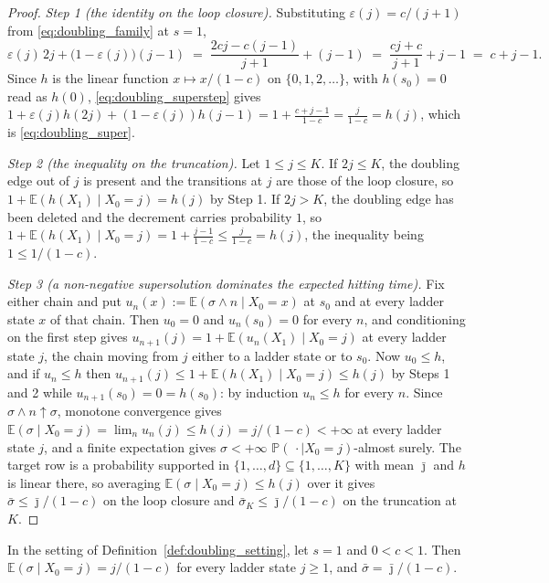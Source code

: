 \begin{proof}
\emph{Step 1 (the identity on the loop closure).} Substituting $\varepsilon(j)=c/(j+1)$ from
\eqref{eq:doubling_family} at $s=1$,
\begin{equation}\label{eq:doubling_superstep}
    \varepsilon(j)\,2j+\bigl(1-\varepsilon(j)\bigr)(j-1)
    \;=\;\frac{2cj-c(j-1)}{j+1}+(j-1)\;=\;\frac{cj+c}{j+1}+j-1\;=\;c+j-1 .
\end{equation}
Since $h$ is the linear function $x\mapsto x/(1-c)$ on $\{0,1,2,\dots\}$, with $h(s_0)=0$ read
as $h(0)$, \eqref{eq:doubling_superstep} gives
$1+\varepsilon(j)h(2j)+(1-\varepsilon(j))h(j-1)=1+\frac{c+j-1}{1-c}=\frac j{1-c}=h(j)$, which
is \eqref{eq:doubling_super}.

\emph{Step 2 (the inequality on the truncation).} Let $1\leq j\leq K$. If $2j\leq K$, the
doubling edge out of $j$ is present and the transitions at $j$ are those of the loop closure,
so $1+\mathbb E(h(X_1)\mid X_0=j)=h(j)$ by Step 1. If $2j>K$, the doubling edge has been deleted and
the decrement carries probability $1$, so
$1+\mathbb E(h(X_1)\mid X_0=j)=1+\frac{j-1}{1-c}\leq\frac j{1-c}=h(j)$, the inequality being
$1\leq1/(1-c)$.

\emph{Step 3 (a non-negative supersolution dominates the expected hitting time).} Fix either
chain and put $u_n(x):=\mathbb E(\sigma\wedge n\mid X_0=x)$ at $s_0$ and at every ladder state $x$ of
that chain. Then $u_0=0$ and $u_n(s_0)=0$ for every $n$, and conditioning on the first step
gives $u_{n+1}(j)=1+\mathbb E(u_n(X_1)\mid X_0=j)$ at every ladder state $j$, the chain moving from
$j$ either to a ladder state or to $s_0$. Now $u_0\leq h$, and if $u_n\leq h$ then
$u_{n+1}(j)\leq1+\mathbb E(h(X_1)\mid X_0=j)\leq h(j)$ by Steps 1 and 2 while $u_{n+1}(s_0)=0=h(s_0)$:
by induction $u_n\leq h$ for every $n$. Since $\sigma\wedge n\uparrow\sigma$, monotone
convergence gives $\mathbb E(\sigma\mid X_0=j)=\lim_nu_n(j)\leq h(j)=j/(1-c)<+\infty$ at every ladder
state $j$, and a finite expectation gives $\sigma<+\infty$ $\mathbb P(\,\cdot\mid X_0=j)$-almost surely. The
target row is a probability supported in $\{1,\dots,d\}\subseteq\{1,\dots,K\}$ with mean
$\bar\jmath$ and $h$ is linear there, so averaging $\mathbb E(\sigma\mid X_0=j)\leq h(j)$ over it
gives $\bar\sigma\leq\bar\jmath/(1-c)$ on the loop closure and
$\bar\sigma_K\leq\bar\jmath/(1-c)$ on the truncation at $K$.
\end{proof}

\begin{proposition}\label{prop:doubling_length}
In the setting of Definition~\ref{def:doubling_setting}, let $s=1$ and $0<c<1$. Then
$\mathbb E(\sigma\mid X_0=j)=j/(1-c)$ for every ladder state $j\geq1$, and
$\bar\sigma=\bar\jmath/(1-c)$.
\end{proposition}


